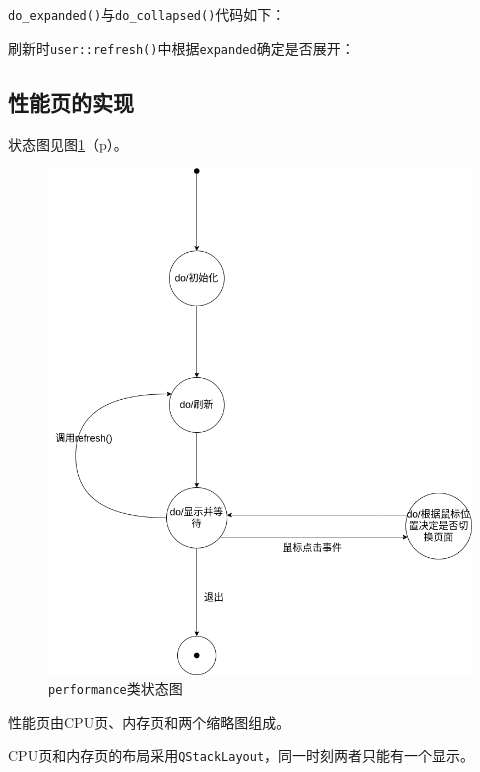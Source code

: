 \documentclass[UTF8,twoside,titlepage]{ctexart}
\newcommand\code[1]{\texttt{#1}}
\newcommand\myref[1]{\ref{#1}（p\pageref{#1}）}
\begin{document}
\code{do\_expanded()}与\code{do\_collapsed()}代码如下：

{
    \ttfamily
    
}

刷新时\code{user::refresh()}中根据\code{expanded}确定是否展开：

{
    \ttfamily
    
}

\subsection{性能页的实现}
\label{subsec:perf}
状态图见图\myref{fig:perfstat}。

\begin{figure}[htb]
    \centering
    \includegraphics[scale=0.4]{../dia/performance.png}
    \caption{\code{performance}类状态图}
    \label{fig:perfstat}
\end{figure}

性能页由CPU页、内存页和两个缩略图组成。

CPU页和内存页的布局采用\code{QStackLayout}，同一时刻两者只能有一个显示。
\end{document}
